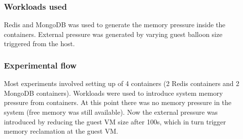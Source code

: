       \subsubsection{Workloads used}
	
	Redis and MongoDB was used to generate the memory pressure inside the containers. External pressure was generated by varying guest 
balloon size triggered from the host.

      \subsubsection{Experimental flow}
	
	Most experiments involved setting up of 4 containers (2 Redis containers and 2 MongoDB containers). Workloads were used to 
introduce system memory pressure from containers. At this point there was no memory pressure in the system (free memory was still 
available). Now the external pressure was introduced by reducing the guest VM size after 100s, which in turn trigger memory reclamation at 
the guest VM.
	